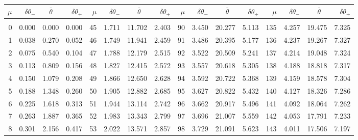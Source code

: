 \clearpage
\begin{table}[!h]\centering
\vspace{0.25cm}
\scriptsize{ \begin{tabular}{rrrr|rrrr|rrrr|rrrr}
$\mu$ & $\delta\theta_-$  & $\bar{\theta}~~~~$ & $\delta\theta_+$ &
$\mu$ & $\delta\theta_-$  & $\bar{\theta}~~~~$ & $\delta\theta_+$ &
$\mu$ & $\delta\theta_-$  & $\bar{\theta}~~~~$ & $\delta\theta_+$ &
$\mu$ & $\delta\theta_-$  & $\bar{\theta}~~~~$ & $\delta\theta_+$ \\\hline
&&&&&&&&&&&&&&&\\[-1.75ex]
  0 & \tiny{  0.000} &   0.000 & \tiny{  0.000} &  45 & \tiny{  1.711} &  11.702 & \tiny{  2.403} &  90 & \tiny{  3.450} &  20.277 & \tiny{  5.113} & 135 & \tiny{  4.257} &  19.475 & \tiny{  7.325}\\
  1 & \tiny{  0.038} &   0.270 & \tiny{  0.052} &  46 & \tiny{  1.749} &  11.941 & \tiny{  2.459} &  91 & \tiny{  3.486} &  20.395 & \tiny{  5.177} & 136 & \tiny{  4.237} &  19.267 & \tiny{  7.327}\\
  2 & \tiny{  0.075} &   0.540 & \tiny{  0.104} &  47 & \tiny{  1.788} &  12.179 & \tiny{  2.515} &  92 & \tiny{  3.522} &  20.509 & \tiny{  5.241} & 137 & \tiny{  4.214} &  19.048 & \tiny{  7.324}\\
  3 & \tiny{  0.113} &   0.809 & \tiny{  0.156} &  48 & \tiny{  1.827} &  12.415 & \tiny{  2.572} &  93 & \tiny{  3.557} &  20.618 & \tiny{  5.305} & 138 & \tiny{  4.188} &  18.818 & \tiny{  7.317}\\
  4 & \tiny{  0.150} &   1.079 & \tiny{  0.208} &  49 & \tiny{  1.866} &  12.650 & \tiny{  2.628} &  94 & \tiny{  3.592} &  20.722 & \tiny{  5.368} & 139 & \tiny{  4.159} &  18.578 & \tiny{  7.304}\\
  5 & \tiny{  0.188} &   1.348 & \tiny{  0.260} &  50 & \tiny{  1.905} &  12.882 & \tiny{  2.685} &  95 & \tiny{  3.627} &  20.822 & \tiny{  5.432} & 140 & \tiny{  4.127} &  18.326 & \tiny{  7.286}\\
  6 & \tiny{  0.225} &   1.618 & \tiny{  0.313} &  51 & \tiny{  1.944} &  13.114 & \tiny{  2.742} &  96 & \tiny{  3.662} &  20.917 & \tiny{  5.496} & 141 & \tiny{  4.092} &  18.064 & \tiny{  7.262}\\
  7 & \tiny{  0.263} &   1.887 & \tiny{  0.365} &  52 & \tiny{  1.983} &  13.343 & \tiny{  2.799} &  97 & \tiny{  3.696} &  21.007 & \tiny{  5.559} & 142 & \tiny{  4.053} &  17.791 & \tiny{  7.233}\\
  8 & \tiny{  0.301} &   2.156 & \tiny{  0.417} &  53 & \tiny{  2.022} &  13.571 & \tiny{  2.857} &  98 & \tiny{  3.729} &  21.091 & \tiny{  5.623} & 143 & \tiny{  4.011} &  17.506 & \tiny{  7.197}\\

\end{tabular}}
\end{table}
